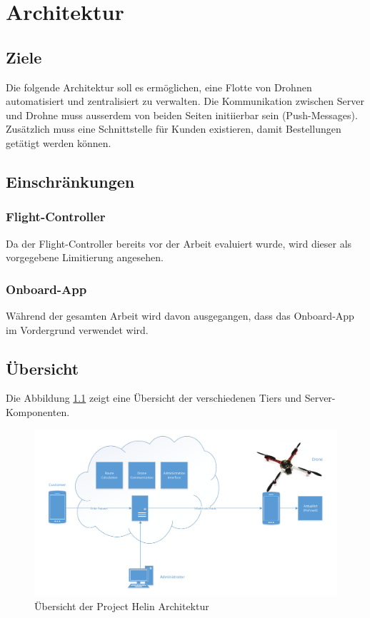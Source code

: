 \chapter{Architektur}

\section{Ziele}

Die folgende Architektur soll es ermöglichen, eine Flotte von Drohnen automatisiert und zentralisiert zu verwalten. Die Kommunikation zwischen Server und Drohne muss ausserdem von beiden Seiten initiierbar sein (Push-Messages). Zusätzlich muss eine Schnittstelle für Kunden existieren, damit Bestellungen getätigt werden können. 


\section{Einschränkungen}

\subsection{Flight-Controller}
Da der Flight-Controller bereits vor der Arbeit evaluiert wurde, wird dieser als vorgegebene Limitierung angesehen.

\subsection{Onboard-App}
Während der gesamten Arbeit wird davon ausgegangen, dass das Onboard-App im Vordergrund verwendet wird.


\section{Übersicht}

Die Abbildung \ref{fig:architecture-overview} zeigt eine Übersicht der verschiedenen Tiers und Server-Komponenten.

\begin{figure}[H]
	\centering
	\includegraphics[width=1\textwidth]{images/Overview-Diagram.pdf}
	\caption{Übersicht der Project Helin Architektur }
	\label{fig:architecture-overview}
\end{figure}

